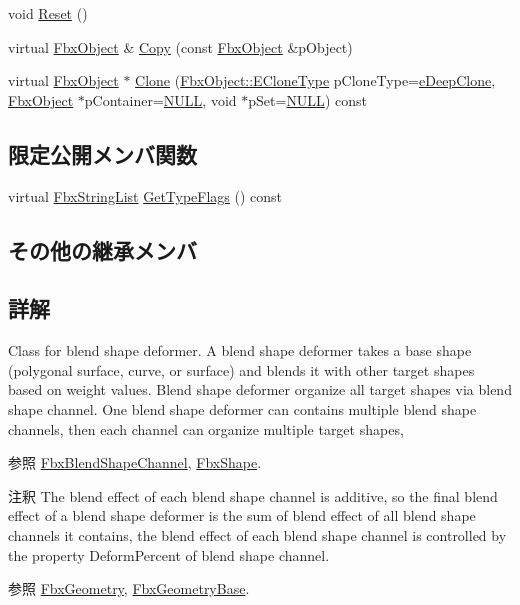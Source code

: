 \begin{DoxyCompactItemize}
\item 
void \hyperlink{class_fbx_blend_shape_ac7076c304c81d96b729188a8f942d84d}{Reset} ()
\item 
virtual \hyperlink{class_fbx_object}{Fbx\+Object} \& \hyperlink{class_fbx_blend_shape_aeecdd8e01145a974bcb53a65cfc913f2}{Copy} (const \hyperlink{class_fbx_object}{Fbx\+Object} \&p\+Object)
\item 
virtual \hyperlink{class_fbx_object}{Fbx\+Object} $\ast$ \hyperlink{class_fbx_blend_shape_aea5560eb695574977b5e7b8d0387d81a}{Clone} (\hyperlink{class_fbx_object_a9f5626b2d2135684d6ea1e6e4ad2acbb}{Fbx\+Object\+::\+E\+Clone\+Type} p\+Clone\+Type=\hyperlink{class_fbx_object_a9f5626b2d2135684d6ea1e6e4ad2acbbaacdf137ca059c572798287e98c4236d0}{e\+Deep\+Clone}, \hyperlink{class_fbx_object}{Fbx\+Object} $\ast$p\+Container=\hyperlink{fbxarch_8h_a070d2ce7b6bb7e5c05602aa8c308d0c4}{N\+U\+LL}, void $\ast$p\+Set=\hyperlink{fbxarch_8h_a070d2ce7b6bb7e5c05602aa8c308d0c4}{N\+U\+LL}) const
\end{DoxyCompactItemize}
\subsection*{限定公開メンバ関数}
\begin{DoxyCompactItemize}
\item 
virtual \hyperlink{class_fbx_string_list}{Fbx\+String\+List} \hyperlink{class_fbx_blend_shape_aa2b22b70c929ac1ad39b12f0ade998d1}{Get\+Type\+Flags} () const
\end{DoxyCompactItemize}
\subsection*{その他の継承メンバ}


\subsection{詳解}
Class for blend shape deformer. A blend shape deformer takes a base shape (polygonal surface, curve, or surface) and blends it with other target shapes based on weight values. Blend shape deformer organize all target shapes via blend shape channel. One blend shape deformer can contains multiple blend shape channels, then each channel can organize multiple target shapes, \begin{DoxySeeAlso}{参照}
\hyperlink{class_fbx_blend_shape_channel}{Fbx\+Blend\+Shape\+Channel}, \hyperlink{class_fbx_shape}{Fbx\+Shape}. 
\end{DoxySeeAlso}
\begin{DoxyRemark}{注釈}
The blend effect of each blend shape channel is additive, so the final blend effect of a blend shape deformer is the sum of blend effect of all blend shape channels it contains, the blend effect of each blend shape channel is controlled by the property Deform\+Percent of blend shape channel. 
\end{DoxyRemark}
\begin{DoxySeeAlso}{参照}
\hyperlink{class_fbx_geometry}{Fbx\+Geometry}, \hyperlink{class_fbx_geometry_base}{Fbx\+Geometry\+Base}. 
\end{DoxySeeAlso}


